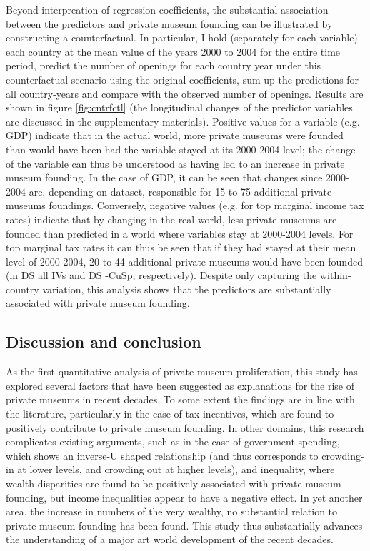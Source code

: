 \documentclass[11pt]{article}
\begin{document}
Beyond interpreation of regression coefficients, the substantial association between the predictors and private museum founding can be illustrated by constructing a counterfactual.
In particular, I hold (separately for each variable) each country at the mean value of the years 2000 to 2004 for the entire time period, predict the number of openings for each country year under this counterfactual scenario using the original coefficients, sum up the predictions for all country-years and compare with the observed number of openings.
Results are shown in figure \ref{fig:cntrfctl} (the longitudinal changes of the predictor variables are discussed in the supplementary materials).
Positive values for a variable (e.g. GDP) indicate that in the actual world, more private museums were founded than would have been had the variable stayed at its 2000-2004 level; the change of the variable can thus be understood as having led to an increase in private museum founding.
In the case of GDP, it can be seen that changes since 2000-2004 are, depending on dataset, responsible for 15 to 75 additional private museums foundings.
Conversely, negative values (e.g. for top marginal income tax rates) indicate that by changing in the real world, less private museums are founded than predicted in a world where variables stay at 2000-2004 levels.
For top marginal tax rates it can thus be seen that if they had stayed at their mean level of 2000-2004, 20 to 44 additional private museums would have been founded (in DS all IVs and DS -CuSp, respectively).
Despite only capturing the within-country variation, this analysis shows that the predictors are substantially associated with private museum founding. 


\subsection*{Discussion and conclusion}

As the first quantitative analysis of private museum proliferation, this study has explored several factors that have been suggested as explanations for the rise of private museums in recent decades.
To some extent the findings are in line with the literature, particularly in the case of tax incentives, which are found to positively contribute to private museum founding.
In other domains, this research complicates existing arguments, such as in the case of government spending, which shows an inverse-U shaped relationship (and thus corresponds to crowding-in at lower levels, and crowding out at higher levels), and inequality, where wealth disparities are found to be positively associated with private museum founding, but income inequalities appear to have a negative effect. 
In yet another area, the increase in numbers of the very wealthy, no substantial relation to private museum founding has been found. 
This study thus substantially advances the understanding of a major art world development of the recent decades.
\end{document}

